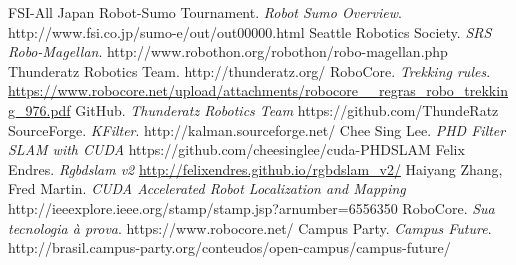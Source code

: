 \documentclass[conference]{IEEEtran}
\begin{document}
\begin{thebibliography}{30}
    FSI-All Japan Robot-Sumo Tournament. \emph{Robot Sumo Overview}. http://www.fsi.co.jp/sumo-e/out/out00000.html
    Seattle Robotics Society. \emph{SRS Robo-Magellan}. http://www.robothon.org/robothon/robo-magellan.php
    Thunderatz Robotics Team. http://thunderatz.org/
    RoboCore. \emph{Trekking rules}. \url{https://www.robocore.net/upload/attachments/robocore__regras_robo_trekking_976.pdf}
    GitHub. \emph{Thunderatz Robotics Team} https://github.com/ThundeRatz
    SourceForge. \emph{KFilter}. http://kalman.sourceforge.net/
    Chee Sing Lee. \emph{PHD Filter SLAM with CUDA} https://github.com/cheesinglee/cuda-PHDSLAM
    Felix Endres. \emph{Rgbdslam v2} \url{http://felixendres.github.io/rgbdslam_v2/}
    Haiyang Zhang, Fred Martin. \emph{CUDA Accelerated Robot Localization and Mapping}
    http://ieeexplore.ieee.org/stamp/stamp.jsp?arnumber=6556350
    RoboCore. \emph{Sua tecnologia à prova}. https://www.robocore.net/
    Campus Party. \emph{Campus Future}. http://brasil.campus-party.org/conteudos/open-campus/campus-future/
\end{thebibliography}
\end{document}
